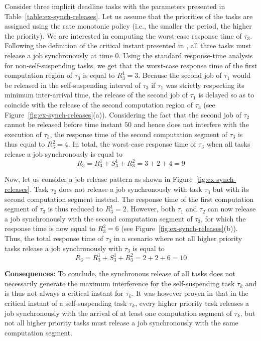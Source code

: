 Consider three implicit deadline tasks with the parameters presented in Table~\ref{table:ex-synch-releases}. Let us assume that the priorities of the tasks are assigned using the rate monotonic policy (i.e., the smaller the period, the higher the priority). We are interested in computing the worst-case response time of $\tau_3$. Following the definition of the critical instant presented in \cite{LR:rtas10}, all three tasks must release a job synchronously at time $0$. Using the standard response-time analysis for non-self-suspending tasks, we get that the worst-case response time of the first computation region of $\tau_3$ is equal to $R_3^1 = 3$. Because the second job of $\tau_1$ would be released in the self-suspending interval of $\tau_3$ if $\tau_1$ was strictly respecting its minimum inter-arrival time, the release of the second job of $\tau_1$ is delayed so as to coincide with the release of the second computation region of $\tau_3$ (see Figure~\ref{fig:ex-synch-releases}(a)). Considering the fact that the second job of $\tau_2$ cannot be released before time instant $50$ and hence does not interfere with the execution of $\tau_3$, the response time of the second computation segment of $\tau_3$ is thus equal to $R_3^2=4$. In total, the worst-case response time of $\tau_3$ when all tasks release a job synchronously is equal to 
$$R_3 = R_3^1 + S_3^1 + R_3^2 = 3 + 2 +4 = 9$$

Now, let us consider a job release pattern as shown in Figure~\ref{fig:ex-synch-releases}. Task $\tau_2$ does not release a job synchronously with task $\tau_3$ but with its second computation segment instead. The response time of the first computation segment of $\tau_3$ is thus reduced to $R_3^1=2$. However, both $\tau_1$ and $\tau_2$ can now release a job synchronously with the second computation segment of $\tau_3$, for which the response time is now equal to $R_3^2=6$ (see Figure~\ref{fig:ex-synch-releases}(b)). Thus, the total response time of $\tau_3$ in a scenario where not all higher priority tasks release a job synchronously with $\tau_3$ is equal to 
$$R_3 = R_3^1 + S_3^1 + R_3^2 = 2+2+6 = 10$$

{\bf Consequences:} To conclude, the synchronous release of all tasks does not necessarily generate the maximum interference for the self-suspending task $\tau_k$ and is thus not always a critical instant for $\tau_k$. 
It was however proven in \cite{ecrts15nelissen} that in the critical instant of a self-suspending task $\tau_k$, every higher priority task releases a job synchronously with the arrival of at least one computation segment of $\tau_k$, but not all higher priority tasks must release a job synchronously with the same computation segment.

